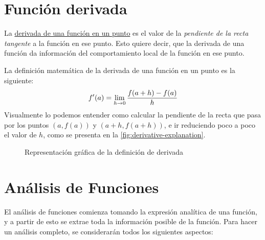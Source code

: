 \documentclass[sans]{apuntes}
\begin{document}
\section{Función derivada}
La \underline{derivada de una función en un punto} es el valor de la \emph{pendiente de la recta tangente} a la función en ese punto. Esto quiere decir, que la derivada de una función da información del comportamiento local de la función en ese punto.
\par La definición matemática de la derivada de una función en un punto es la siguiente:
\[f'(a) = \displaystyle\lim_{h \to 0}\frac{f(a + h) - f(a)}{h}\]
Visualmente lo podemos entender como calcular la pendiente de la recta que pasa por los puntos $(a, f(a))$ y $(a+h, f(a+h))$, e ir reduciendo poco a poco el valor de $h$, como se presenta en la \autoref{fig:derivative-explanation}.

\begin{figure}[!ht]
	\centering
	\caption{Representación gráfica de la definición de derivada}
	\label{fig:derivative-explanation}
\end{figure}

\section{Análisis de Funciones}
El análisis de funciones comienza tomando la expresión analítica de una función, y a partir de esto se extrae toda la información posible de la función. Para hacer un análisis completo, se considerarán todos los siguientes aspectos:
\end{document}
